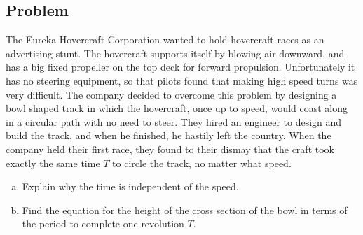 \documentclass[solutions]{esg8012pset}
\begin{document}
\subsection*{Problem}
  The Eureka Hovercraft Corporation wanted to hold hovercraft races as an advertising stunt. The hovercraft supports itself by blowing air downward, and has a big fixed propeller on the top deck for forward propulsion. Unfortunately it has no steering equipment, so that pilots found that making high speed turns was very difficult. The company decided to overcome this problem by designing a bowl shaped track in which the hovercraft, once up to speed, would coast along in a circular path with no need to steer. They hired an engineer to design and build the track, and when he finished, he hastily left the country. When the company held their first race, they found to their dismay that the craft took exactly the same time $T$ to circle the track, no matter what speed.
  \begin{enumerate}[a)]
    \item Explain why the time is independent of the speed.
    \item Find the equation for the height of the cross section of the bowl in terms of the period to complete one revolution $T$.
  \end{enumerate}
\end{document}
